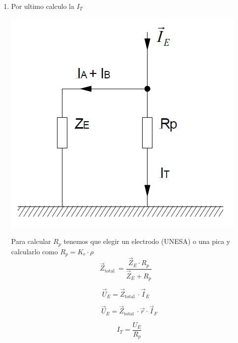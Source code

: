 \documentclass[10pt,a4paper]{article}
\begin{document}
\begin{itemize}
\begin{enumerate}
    \newpage
    \item Por ultimo calculo la $I_T$
    \begin{center}
        \includegraphics[scale = 0.45]{assets/102.png}
    \end{center}
    Para calcular $R_p$ tenemos que elegir un electrodo (UNESA) o una pica y calcularlo como $R_p = K_r \cdot \rho$
    $$
    \vec{Z}_{\text {total }}=\frac{\vec{Z}_{E} \cdot R_{p}}{\vec{Z}_{E}+R_{p}} \quad
    $$
    
    $$
    \vec{U}_{E}=\vec{Z}_{\text {total }} \cdot \vec{I}_{E} \quad 
    $$
    
    $$
    \vec{U}_{E}=\vec{Z}_{\text {total }} \cdot \vec{r} \cdot \vec{I}_{F}
    $$
    
    $$
    I_T =\frac{U_E}{R_p}
    $$
    \end{enumerate}
\end{itemize}
\newpage
\end{document}
